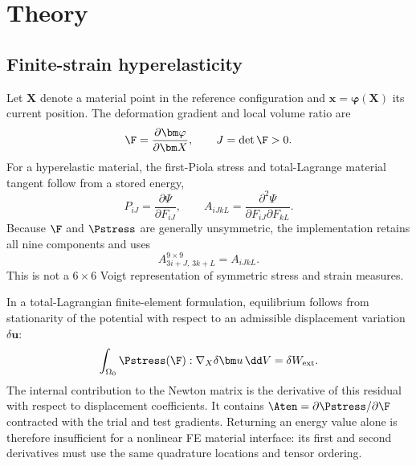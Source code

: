 \chapter{Theory}
\label{ch:theory}

\section{Finite-strain hyperelasticity}

Let \(\bm X\) denote a material point in the reference configuration and
\(\bm x=\bm\varphi(\bm X)\) its current position. The deformation gradient and
local volume ratio are
\begin{equation}
  \F=\frac{\partial\bm\varphi}{\partial\bm X},
  \qquad J=\det\F>0.
\end{equation}
For a hyperelastic material, the first-Piola stress and total-Lagrange
material tangent follow from a stored energy,
\begin{equation}
  P_{iJ}=\frac{\partial\Psi}{\partial F_{iJ}},
  \qquad
  A_{iJkL}
  =\frac{\partial^2\Psi}{\partial F_{iJ}\partial F_{kL}}.
  \label{eq:stress-tangent}
\end{equation}
Because \(\F\) and \(\Pstress\) are generally unsymmetric, the implementation
retains all nine components and uses
\begin{equation}
  A^{9\times9}_{3i+J,\,3k+L}=A_{iJkL}.
  \label{eq:flattening}
\end{equation}
This is not a \(6\times6\) Voigt representation of symmetric stress and
strain measures.

In a total-Lagrangian finite-element formulation, equilibrium follows from
stationarity of the potential with respect to an admissible displacement
variation \(\delta\bm u\):
\begin{equation}
  \int_{\Omega_0} \Pstress(\F):\nabla_X\delta\bm u\,\dd V
  = \delta W_{\mathrm{ext}}.
  \label{eq:weak-equilibrium}
\end{equation}
The internal contribution to the Newton matrix is the derivative of this
residual with respect to displacement coefficients. It contains
\(\Aten=\partial\Pstress/\partial\F\) contracted with the trial and test
gradients. Returning an energy value alone is therefore insufficient for a
nonlinear FE material interface: its first and second derivatives must use
the same quadrature locations and tensor ordering.

